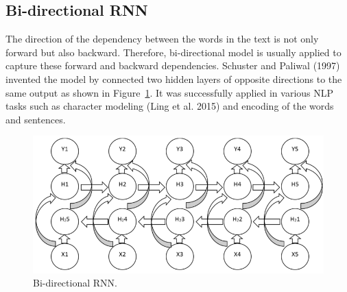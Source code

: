 \subsection{Bi-directional RNN}
The direction of the dependency between the words in the text
is not only forward but also backward. 
Therefore, bi-directional model is usually applied to 
capture these forward and backward dependencies. 
Schuster and Paliwal (1997) \cite{schuster1997bidirectional} invented 
the model by connected two hidden layers of opposite directions to the same
output as shown in Figure~\ref{fig:2}. 
It was successfully applied in various NLP tasks such as character
modeling (Ling et al. 2015) \cite{ling2015finding}
and encoding of the words and sentences.
\begin{figure}[!h]
\centering
  \includegraphics[scale=0.8]{image/birnn.png}
  \caption{Bi-directional RNN.}
  \label{fig:2}
\end{figure}
